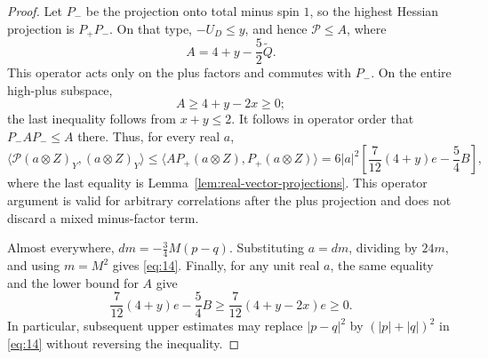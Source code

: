 \begin{proof}
Let \(P_-\) be the projection onto total minus spin \(1\), so the
highest Hessian projection is \(P_+P_-\).  On that type,
\(-U_D\le y\), and hence \(\mathcal P\le A\), where
\[
 A=4+y-\frac52\widetilde Q.
\]
This operator acts only on the plus factors and commutes with \(P_-\).
On the entire high-plus subspace,
\[
 A\ge4+y-2x\ge0;
\]
the last inequality follows from \(x+y\le2\).
It follows in operator order that \(P_-AP_-\le A\) there.
Thus, for every real \(a\),
\[
 \langle\mathcal P(a\otimes Z)_Y,(a\otimes Z)_Y\rangle
 \le \langle AP_+(a\otimes Z),P_+(a\otimes Z)\rangle
 =6|a|^2\left[\frac7{12}(4+y)e-\frac54B\right],
\]
where the last equality is Lemma~\ref{lem:real-vector-projections}.
This operator argument is valid for arbitrary correlations after the
plus projection and does not discard a mixed minus-factor term.

Almost everywhere,
\(dm=-\frac34M(p-q)\).
Substituting \(a=dm\), dividing by \(24m\), and using \(m=M^2\)
gives \eqref{eq:14}.
Finally, for any unit real \(a\), the same equality and the lower bound
for \(A\) give
\[
 \frac7{12}(4+y)e-\frac54B
 \ge \frac7{12}(4+y-2x)e\ge0.
\]
In particular, subsequent upper estimates may replace \(|p-q|^2\) by
\((|p|+|q|)^2\) in \eqref{eq:14} without reversing the inequality.
\end{proof}
